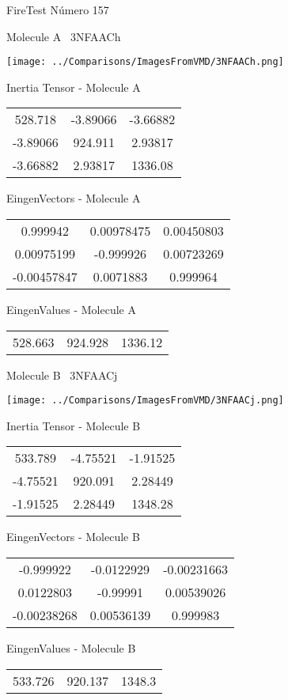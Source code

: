 \vtab[-3cm]
\begin{center}
{\large FireTest \tab Número 157}
\end{center}
\begin{multicols}{2}
\begin{center}

Molecule A \
3NFAACh

\texttt{[image: ../Comparisons/ImagesFromVMD/3NFAACh.png]}

Inertia Tensor - Molecule A \\
\begin{tabular}{|c c c|}
528.718	 & 	-3.89066	 & 	-3.66882	 \\
-3.89066	 & 	924.911	 & 	2.93817	 \\
-3.66882	 & 	2.93817	 & 	1336.08
\end{tabular}

\vtab
 EingenVectors - Molecule A     \\
\begin{tabular}{|c c c|}
0.999942	 & 	0.00978475	 & 	0.00450803	 \\
0.00975199	 & 	-0.999926	 & 	0.00723269	 \\
-0.00457847	 & 	0.0071883	 & 	0.999964
\end{tabular}

\vtab
 EingenValues - Molecule A     \\
\begin{tabular}{|c c c|}
528.663	 & 	924.928	 & 	1336.12	 \\
\end{tabular}
\columnbreak

Molecule B \
3NFAACj

\texttt{[image: ../Comparisons/ImagesFromVMD/3NFAACj.png]}

Inertia Tensor - Molecule B \\
\begin{tabular}{|c c c|}
533.789	 & 	-4.75521	 & 	-1.91525	 \\
-4.75521	 & 	920.091	 & 	2.28449	 \\
-1.91525	 & 	2.28449	 & 	1348.28
\end{tabular}

\vtab
 EingenVectors - Molecule B     \\
\begin{tabular}{|c c c|}
-0.999922	 & 	-0.0122929	 & 	-0.00231663	 \\
0.0122803	 & 	-0.99991	 & 	0.00539026	 \\
-0.00238268	 & 	0.00536139	 & 	0.999983
\end{tabular}

\vtab
 EingenValues - Molecule B     \\
\begin{tabular}{|c c c|}
533.726	 & 	920.137	 & 	1348.3	 \\
\end{tabular}

\end{center}
\end{multicols}

